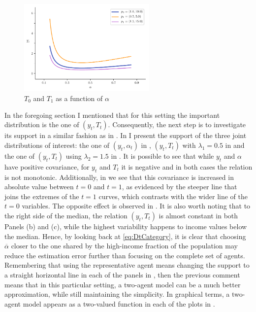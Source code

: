 \documentclass[english, a4paper, 12pt]{article}
\begin{document}
	\begin{figure}
		\caption{$T_{0}$ and $T_{1}$ as a function of $\alpha$}
		\label{fig:DiffTtLambda}
		\includegraphics[width = 0.6\textwidth]{TtLambdas}
		\vspace{-1.5ex}
	\end{figure}
In the foregoing section I mentioned that for this setting the important distribution is the one of $(y_{t}, T_{t})$. Consequently, the next step is to investigate its support in a similar fashion as in . In  I present the support of the three joint distributions of interest: the one of $(y_{t}, \alpha_{t})$ in , $(y_{t}, T_{t})$ with $\lambda_{1} = 0.5$ in  and the one of $(y_{t}, T_{t})$ using $\lambda_{2} = 1.5$ in . It is possible to see that while $y_{t}$ and $\alpha$ have positive covariance, for $y_{t}$ and $T_{t}$ it is negative and in both cases the relation is not monotonic. Additionally, in  we see that this covariance is increased in absolute value between $t = 0$ and $t = 1$, as evidenced by the steeper line that joins the extremes of the $t=1$ curves, which contrasts with the wider line of the $t=0$ variables. The opposite effect is observed in . It is also worth noting that to the right side of the median, the relation $(y_{t}, T_{t})$ is almost constant in both Panels (b) and (c), while the highest variability happens to income values below the median. Hence, by looking back at \eqref{eq:DtCategory}, it is clear that choosing $\overline{\alpha}$ closer to the one shared by the high-income fraction of the population may reduce the estimation error further than focusing on the complete set of agents. Remembering that using the representative agent means changing the support to a straight horizontal line in each of the panels in , then the previous comment means that in this particular setting, a two-agent model can be a much better approximation, while still maintaining the simplicity. In graphical terms, a two-agent model appears as a two-valued function in each of the plots in .
\end{document}
